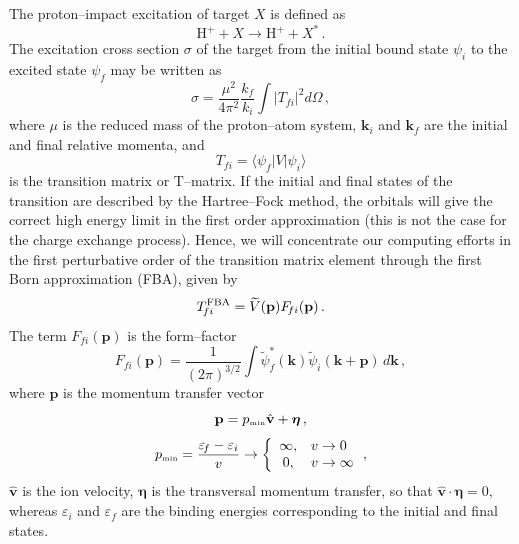 \documentclass[10pt]{article}
\begin{document}
The proton--impact excitation of target $X$ is defined as 
\begin{equation}
 \mbox{H}^+ + X \rightarrow \mbox{H}^+ + X^*\,.
\end{equation}
The excitation cross section $\sigma$ of the target from the initial bound
state $\psi_i$ to the excited state $\psi_{\!f}$ may be written as 
\begin{equation}
 \sigma=\frac{\mu^2}{4\pi^2}\frac{k_{\!f}}{k_i}\int{\left|T_{\!fi}\right|^2 
 d\Omega}\,,
  \label{eq:cross-section}
\end{equation}
where $\mu$ is the reduced mass of the proton--atom system, 
$\mathbf{k}_i$ and $\mathbf{k}_{\!f}$ are the initial and final relative 
momenta, and 
\begin{equation}
 T_{\!fi}=\langle \psi_{\!f}|V|\psi_i\rangle
 \label{eq:transition-matrix}
\end{equation}
is the transition matrix or T--matrix.
If the initial and final states of the transition are described by
the Hartree--Fock method, the orbitals will give the correct high 
energy limit in the first order approximation (this is not the case 
for the charge exchange process). Hence, we will concentrate our 
computing efforts in the first perturbative order of the transition
matrix element through the first Born approximation (FBA), given by
\begin{equation}
 T_{\!fi}^{\mbox{\scriptsize FBA}} = \widetilde{V}(\mathbf{p}) F_{\!fi}(\mathbf{p}) \,.
 \label{eq:firstbornTmatrix}
\end{equation}
The term $F_{\!fi}(\mathbf{p})$ is the form--factor
\begin{equation}
 F_{fi}(\mathbf{p}) = \frac{1}{(2\pi)^{3/2}} 
 \int{\widetilde{\psi}_{\!f}^*(\mathbf{k})
 \widetilde{\psi}_i(\mathbf{k}+\mathbf{p})\,d\mathbf{k}}\,,
 \label{eq:form-factor}
\end{equation}
where $\mathbf{p}$ is the momentum transfer vector
\begin{equation}
 \mathbf{p} = p_{\mbox{\tiny min}} \hat{\mathbf{v}} + \boldsymbol{\eta} \,,
\end{equation}
\begin{equation}
 p_{\mbox{\tiny min}} = \frac{\varepsilon_{\!f}-\varepsilon_i}{v} \rightarrow 
 \bigg\{
 \begin{array}{cl}
  \infty, &v\rightarrow 0 \\
  0, &v\rightarrow \infty
 \end{array}
 \,,
 \label{eq:pmin}
\end{equation}
$\hat{\mathbf{v}}$ is the ion velocity, $\boldsymbol{\eta}$ is
the transversal momentum transfer, so that 
$\hat{\mathbf{v}} \cdot \boldsymbol{\eta}=0$, whereas $\varepsilon_i$ 
and $\varepsilon_{\!f}$ are the binding energies corresponding to the 
initial and final states.
\end{document}
